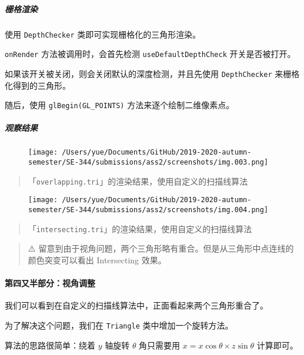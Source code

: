 \documentclass[
]{article}
\begin{document}
\hypertarget{header-n139}{%
\subparagraph{栅格渲染}\label{header-n139}}

使用 \texttt{DepthChecker} 类即可实现栅格化的三角形渲染。

\texttt{onRender} 方法被调用时，会首先检测 \texttt{useDefaultDepthCheck}
开关是否被打开。

如果该开关被关闭，则会关闭默认的深度检测，并且先使用
\texttt{DepthChecker} 来栅格化得到的三角形。

随后，使用 \texttt{glBegin(GL\_POINTS)} 方法来逐个绘制二维像素点。

\hypertarget{header-n144}{%
\subparagraph{观察结果}\label{header-n144}}

\begin{figure}
\centering
\texttt{[image: /Users/yue/Documents/GitHub/2019-2020-autumn-semester/SE-344/submissions/ass2/screenshots/img.003.png]}
\caption{}
\end{figure}

\begin{quote}
「\texttt{overlapping.tri}」的渲染结果，使用自定义的扫描线算法
\end{quote}

\begin{figure}
\centering
\texttt{[image: /Users/yue/Documents/GitHub/2019-2020-autumn-semester/SE-344/submissions/ass2/screenshots/img.004.png]}
\caption{}
\end{figure}

\begin{quote}
「\texttt{intersecting.tri}」的渲染结果，使用自定义的扫描线算法
\end{quote}

\begin{quote}
⚠️
留意到由于视角问题，两个三角形略有重合。但是从三角形中点连线的颜色突变可以看出
Intersecting 效果。
\end{quote}

\hypertarget{header-n153}{%
\paragraph{第四又半部分：视角调整}\label{header-n153}}

我们可以看到在自定义的扫描线算法中，正面看起来两个三角形重合了。

为了解决这个问题，我们在 \texttt{Triangle} 类中增加一个旋转方法。

算法的思路很简单：绕着 \(y\) 轴旋转 \(\theta\) 角只需要用
\(x = x\cos\theta \times z\sin\theta\) 计算即可。
\end{document}
